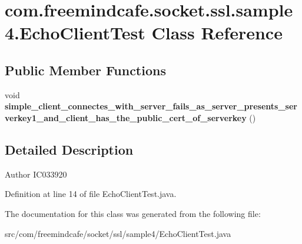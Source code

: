 \hypertarget{classcom_1_1freemindcafe_1_1socket_1_1ssl_1_1sample4_1_1_echo_client_test}{}\section{com.\+freemindcafe.\+socket.\+ssl.\+sample4.\+Echo\+Client\+Test Class Reference}
\label{classcom_1_1freemindcafe_1_1socket_1_1ssl_1_1sample4_1_1_echo_client_test}
\subsection*{Public Member Functions}
\begin{DoxyCompactItemize}
\item 
\hypertarget{classcom_1_1freemindcafe_1_1socket_1_1ssl_1_1sample4_1_1_echo_client_test_a971e75bfc4c149ff9f21082bddec1b2e}{}void {\bfseries simple\+\_\+client\+\_\+connectes\+\_\+with\+\_\+server\+\_\+fails\+\_\+as\+\_\+server\+\_\+presents\+\_\+serverkey1\+\_\+and\+\_\+client\+\_\+has\+\_\+the\+\_\+public\+\_\+cert\+\_\+of\+\_\+serverkey} ()\label{classcom_1_1freemindcafe_1_1socket_1_1ssl_1_1sample4_1_1_echo_client_test_a971e75bfc4c149ff9f21082bddec1b2e}

\end{DoxyCompactItemize}


\subsection{Detailed Description}
\begin{DoxyAuthor}{Author}
I\+C033920 
\end{DoxyAuthor}


Definition at line 14 of file Echo\+Client\+Test.\+java.



The documentation for this class was generated from the following file\+:\begin{DoxyCompactItemize}
\item 
src/com/freemindcafe/socket/ssl/sample4/Echo\+Client\+Test.\+java\end{DoxyCompactItemize}
